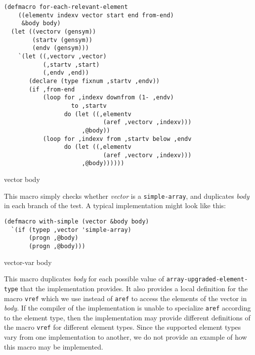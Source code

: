 {\small\begin{verbatim}
(defmacro for-each-relevant-element
    ((elementv indexv vector start end from-end)
     &body body)
  (let ((vectorv (gensym))
        (startv (gensym))
        (endv (gensym)))
    `(let ((,vectorv ,vector)
           (,startv ,start)
           (,endv ,end))
       (declare (type fixnum ,startv ,endv))
       (if ,from-end
           (loop for ,indexv downfrom (1- ,endv)
                   to ,startv
                 do (let ((,elementv
                            (aref ,vectorv ,indexv)))
                      ,@body))
           (loop for ,indexv from ,startv below ,endv
                 do (let ((,elementv
                            (aref ,vectorv ,indexv)))
                      ,@body))))))
\end{verbatim}}
\noindent
{} {vector \body body}

This macro simply checks whether \textit{vector} is a
\texttt{simple-array}, and duplicates \textit{body} in each branch of
the test.  A typical implementation might look like this:

{\small\begin{verbatim}
(defmacro with-simple (vector &body body)
  `(if (typep ,vector 'simple-array)
       (progn ,@body)
       (progn ,@body)))
\end{verbatim}}
\noindent
{} {vector-var \body body}

This macro duplicates \textit{body} for each possible value of
\texttt{array-upgraded-element-type} that the implementation provides.
It also provides a local definition for the macro \texttt{vref} which
we use instead of \texttt{aref} to access the elements of the vector
in \textit{body}.  If the compiler of the implementation is unable to
specialize \texttt{aref} according to the element type, then the
implementation may provide different definitions of the macro
\texttt{vref} for different element types.  Since the supported
element types vary from one implementation to another, we do not
provide an example of how this macro may be implemented.
